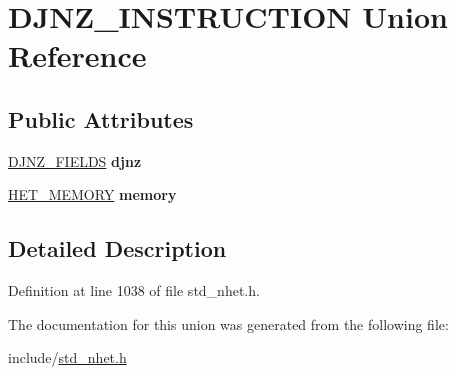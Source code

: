 \hypertarget{unionDJNZ__INSTRUCTION}{}\section{D\+J\+N\+Z\+\_\+\+I\+N\+S\+T\+R\+U\+C\+T\+I\+ON Union Reference}
\label{unionDJNZ__INSTRUCTION}
\subsection*{Public Attributes}
\begin{DoxyCompactItemize}
\item 
\mbox{\label{unionDJNZ__INSTRUCTION_acd92e88ab9c685f9a6223381b4340fda}} 
\mbox{\hyperlink{structdjnz__format}{D\+J\+N\+Z\+\_\+\+F\+I\+E\+L\+DS}} {\bfseries djnz}
\item 
\mbox{\label{unionDJNZ__INSTRUCTION_a50e09494b5b65f33db1e4b282ed319ea}} 
\mbox{\hyperlink{structmemory__format}{H\+E\+T\+\_\+\+M\+E\+M\+O\+RY}} {\bfseries memory}
\end{DoxyCompactItemize}


\subsection{Detailed Description}


Definition at line 1038 of file std\+\_\+nhet.\+h.



The documentation for this union was generated from the following file\+:\begin{DoxyCompactItemize}
\item 
include/\mbox{\hyperlink{std__nhet_8h}{std\+\_\+nhet.\+h}}\end{DoxyCompactItemize}

